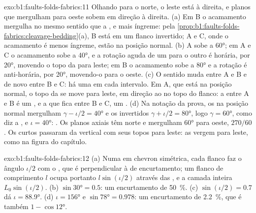 \begin{solution}{exo:b1:faults-folds-fabrics:11}
Olhando para o norte, o leste está à direita, e planos que mergulham para oeste sobem em direção à direita.
(a) Em B o acamamento mergulha no mesmo sentido que a , e mais íngreme: pela
\cref{prop:b1:faults-folds-fabrics:cleavage-bedding}(a), B está em um flanco invertido; A e C, onde o acamamento é menos íngreme, estão na posição normal. (b) A  sobe a \ang{60}; em A e C o acamamento sobe a
\ang{40}, e a rotação aguda de um para o outro é horária, por
\ang{20}, movendo o topo da  para leste; em B o acamamento sobe a
\ang{80} e a rotação é anti-horária, por \ang{20}, movendo-o para o oeste. (c) O sentido muda entre A e B e de novo entre B e C: há uma  em cada intervalo. Em A, que está na posição normal, o topo da  se move para leste, em direção ao  no topo do flanco: a  entre A e B é um , e a que fica entre B e C, um .
(d) Na notação da prova, os  na posição normal mergulham $\gamma - \iota/2 = \ang{40}$ e os  invertidos $\gamma + \iota/2 =
\ang{80}$, logo $\gamma = \ang{60}$, como diz a , e $\iota =
\ang{40}$: . Os planos axiais têm  norte e mergulham \ang{60} para oeste,  $270/60$. Os  curtos passaram da vertical com seus topos para leste: as  vergem para leste, como na figura do capítulo.
\end{solution}

\begin{solution}{exo:b1:faults-folds-fabrics:12}
(a) Numa  em chevron simétrica, cada flanco faz o ângulo $\iota/2$ com o , que é perpendicular à  de encurtamento; um flanco de comprimento $l$ ocupa portanto $l\sin(\iota/2)$ através das , e a camada inteira $L_0\sin(\iota/2)$.
(b) $\sin\ang{30} = 0.5$: um encurtamento de
\qty{50}{\percent}. (c) $\sin(\iota/2) = 0.7$ dá $\iota = \ang{88.9}$.
(d) $\iota = \ang{156}$ e $\sin\ang{78} = 0.978$: um encurtamento de
\qty{2.2}{\percent}, que é também $1 - \cos\ang{12}$.
\end{solution}

